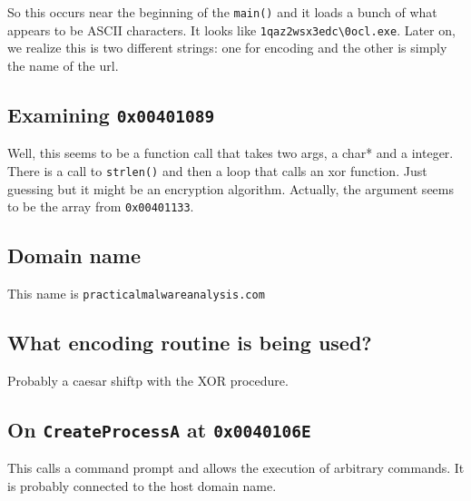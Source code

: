 \documentclass[11pt]{article}
\begin{document}
So this occurs near the beginning of the \texttt{main()} and it loads a bunch of what appears to be
ASCII characters. It looks like \texttt{1qaz2wsx3edc\textbackslash{}0ocl.exe}. Later on,
we realize this is two different strings: one for encoding and the other
is simply the name of the url.  

\subsection{Examining \texttt{0x00401089}}
\label{sec:org924948a}
Well, this seems to be a function call that takes two args, a char* and a integer. There is a 
call to \texttt{strlen()} and then a loop that calls an xor function. Just guessing but it might be an
encryption algorithm. Actually, the argument seems to be the array from \texttt{0x00401133}.

\subsection{Domain name}
\label{sec:orge505dcf}
This name is \texttt{practicalmalwareanalysis.com}

\subsection{What encoding routine is being used?}
\label{sec:org9f85ec7}
Probably a caesar shiftp with the XOR procedure.

\subsection{On \texttt{CreateProcessA} at \texttt{0x0040106E}}
\label{sec:org4b8170d}
This calls a command prompt and allows the execution of arbitrary commands. It is probably connected 
to the host domain name.
\end{document}
